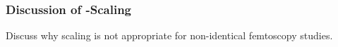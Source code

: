 \documentclass[/home/jesse/Analysis/FemtoAnalysis/AnalysisNotes/AnalysisNoteJBuxton.tex]{subfiles}
\begin{document}
\subsubsection{Discussion of \mt-Scaling}
\label{ResultsLamK_DiscussionOfmTScaling}

Discuss why \mt scaling is not appropriate for non-identical femtoscopy studies.



\clearpage
\end{document}
